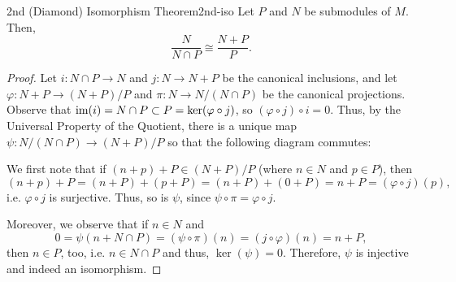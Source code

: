 \begin{theorem}{2nd (Diamond) Isomorphism Theorem}{2nd-iso}
	Let $P$ and $N$ be submodules of $M$.
	Then,
	\[
		\frac{N}{N \cap P} \cong \frac{N + P}{P}.
	\]
\end{theorem}
\begin{proof}
	Let $i : N \cap P \to N$ and $j : N \to N + P$ be the canonical inclusions, and let $\varphi : N + P \to (N + P) / P$ and $\pi : N \to N / (N \cap P)$ be the canonical projections.
	Observe that $\operatorname{im}(i) = N \cap P \subset P = \ker(\varphi \circ j)$, so $(\varphi \circ j) \circ i = 0$.
	Thus, by the Universal Property of the Quotient, there is a unique map $\psi : N / (N \cap P) \to (N + P) / P$ so that the following diagram commutes:
	\begin{figure}[H]
		\centering
	\end{figure}
	We first note that if $(n + p) + P \in (N + P) / P$ (where $n \in N$ and $p \in P$), then
	\[
		(n + p) + P = (n + P) + (p + P) = (n + P) + (0 + P) = n + P = (\varphi \circ j)(p),
	\]
	i.e. $\varphi \circ j$ is surjective.
	Thus, so is $\psi$, since $\psi \circ \pi = \varphi \circ j$.

	Moreover, we observe that if $n \in N$ and
	\[
		0 = \psi(n + N \cap P) = (\psi \circ \pi)(n) = (j \circ \varphi)(n) = n + P,
	\]
	then $n \in P$, too, i.e. $n \in N \cap P$ and thus, $\ker(\psi) = 0$.
	Therefore, $\psi$ is injective and indeed an isomorphism.
\end{proof}

